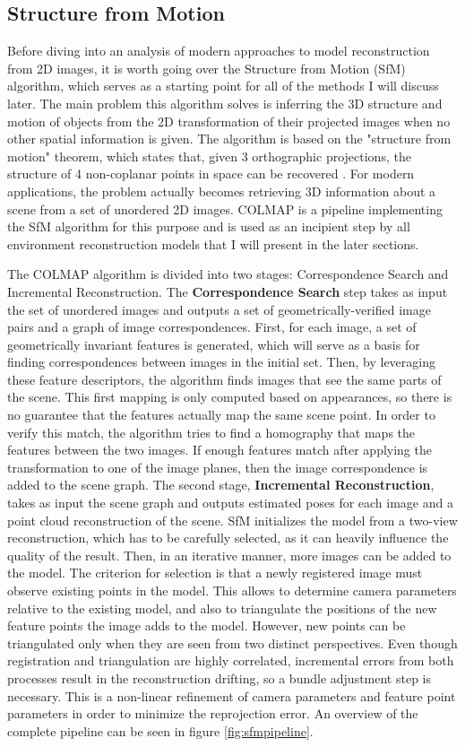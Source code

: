 \subsection{Structure from Motion}
Before diving into an analysis of modern approaches to model reconstruction from 2D images, it is worth going over the Structure from Motion (SfM) algorithm, which serves as a starting point for all of the methods I will discuss later. The main problem this algorithm solves is inferring the 3D structure and motion of objects from the 2D transformation of their projected images when no other spatial information is given. The algorithm is based on the "structure from motion" theorem, which states that, given 3 orthographic projections, the structure of 4 non-coplanar points in space can be recovered \cite{ullman79}. For modern applications, the problem actually becomes retrieving 3D information about a scene from a set of unordered 2D images. COLMAP \cite{schoenberger2016mvs,schoenberger2016sfm} is a pipeline implementing the SfM algorithm for this purpose and is used as an incipient step by all environment reconstruction models that I will present in the later sections. 

The COLMAP algorithm is divided into two stages: Correspondence Search and Incremental Reconstruction. The \textbf{Correspondence Search} step takes as input the set of unordered images and outputs a set of geometrically-verified image pairs and a graph of image correspondences. First, for each image, a set of geometrically invariant features is generated, which will serve as a basis for finding correspondences between images in the initial set. Then, by leveraging these feature descriptors, the algorithm finds images that see the same parts of the scene. This first mapping is only computed based on appearances, so there is no guarantee that the features actually map the same scene point. In order to verify this match, the algorithm tries to find a homography that maps the features between the two images. If enough features match after applying the transformation to one of the image planes, then the image correspondence is added to the scene graph. The second stage, \textbf{Incremental Reconstruction}, takes as input the scene graph and outputs estimated poses for each image and a point cloud reconstruction of the scene. SfM initializes the model from a two-view reconstruction, which has to be carefully selected, as it can heavily influence the quality of the result. Then, in an iterative manner, more images can be added to the model. The criterion for selection is that a newly registered image must observe existing points in the model. This allows to determine camera parameters relative to the existing model, and also to triangulate the positions of the new feature points the image adds to the model. However, new points can be triangulated only when they are seen from two distinct perspectives. Even though registration and triangulation are highly correlated, incremental errors from both processes result in the reconstruction drifting, so a bundle adjustment step is necessary. This is a non-linear refinement of camera parameters and feature point parameters in order to minimize the reprojection error. An overview of the complete pipeline can be seen in figure \ref{fig:sfmpipeline}.

